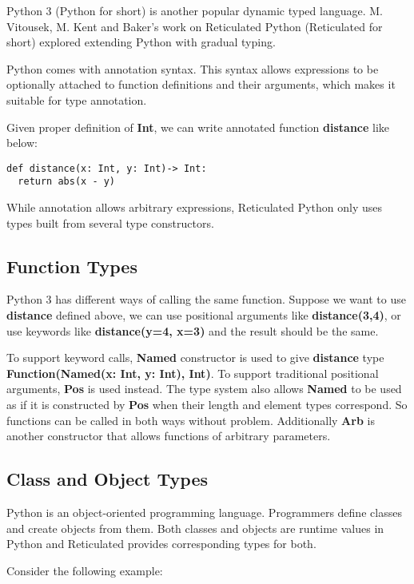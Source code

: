 Python 3 (Python for short) is another popular dynamic typed language.
M. Vitousek, M. Kent and Baker's work on Reticulated Python (Reticulated for short)
explored extending Python with gradual typing.

Python comes with annotation syntax.
This syntax allows expressions to be optionally attached to
function definitions and their arguments,
which makes it suitable for type annotation.

Given proper definition of \textbf{Int}, we can write annotated
function \textbf{distance} like below:

\begin{verbatim}
def distance(x: Int, y: Int)-> Int:
  return abs(x - y)
\end{verbatim}

While annotation allows arbitrary expressions, Reticulated Python
only uses types built from several type constructors.

\subsection{Function Types}

Python 3 has different ways of calling the same function.
Suppose we want to use \textbf{distance} defined above,
we can use positional arguments like \textbf{distance(3,4)},
or use keywords like \textbf{distance(y=4, x=3)} and the result should be the same.

To support keyword calls, \textbf{Named} constructor is used to give
\textbf{distance} type \textbf{Function(Named(x: Int, y: Int), Int)}.
To support traditional positional arguments, \textbf{Pos} is used instead.
The type system also allows \textbf{Named} to be used as if it is constructed by \textbf{Pos}
when their length and element types correspond. So functions can be called in both
ways without problem. Additionally \textbf{Arb} is another constructor
that allows functions of arbitrary parameters.

\subsection{Class and Object Types}

Python is an object-oriented programming language.
Programmers define classes and create objects from them.
Both classes and objects are runtime values in Python
and Reticulated provides corresponding types for both.

Consider the following example:

